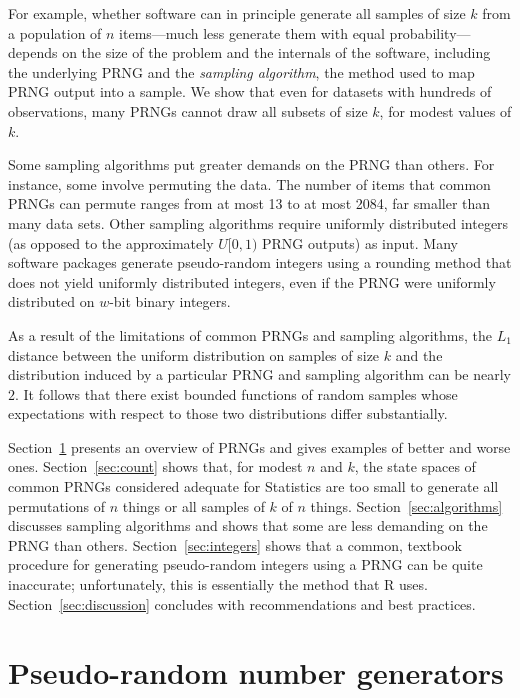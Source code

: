 \documentclass[graybox]{svmult}
\begin{document}
For example, whether software can in principle generate all samples of size $k$ from a population of
$n$ items---much less generate them with equal probability---depends on the size of the problem and the internals of the software, including the underlying PRNG and the \emph{sampling algorithm},
the method used to map PRNG output into a sample.
We show that even for datasets with hundreds of observations, 
many PRNGs cannot draw all subsets of size $k$, for modest values of $k$.

Some sampling algorithms put greater demands on the PRNG than others.
For instance, some involve permuting the data.
The number of items that common PRNGs can permute ranges from at most 13 to at most 2084, far smaller than many data sets.
Other sampling algorithms require uniformly distributed integers (as opposed to the approximately $U[0,1)$ PRNG outputs) as input.
Many software packages generate
pseudo-random integers using a rounding method that does not yield uniformly distributed integers, even
if the PRNG were uniformly distributed on $w$-bit binary integers.

As a result of the limitations of common PRNGs and sampling algorithms,
the $L_1$ distance between the uniform distribution on samples of
size $k$ and the distribution induced by a particular PRNG and sampling algorithm can be nearly $2$.
It follows that there exist bounded functions of random samples whose expectations with respect to those two distributions differ substantially. 

Section~\ref{sec:prngs} presents an overview of PRNGs and gives examples of better and worse ones.
Section~\ref{sec:count} shows that, for modest $n$ and $k$, the state spaces of common PRNGs considered adequate for Statistics are too small to generate all permutations of $n$ things or all samples of $k$ of $n$ things. 
Section~\ref{sec:algorithms} discusses sampling algorithms and shows that some are less demanding on the PRNG than others. 
Section~\ref{sec:integers} shows that a common, textbook procedure for generating pseudo-random integers using a PRNG can be quite inaccurate; unfortunately, this is essentially the method that R uses.
Section~\ref{sec:discussion} concludes with recommendations and best practices.

\section{Pseudo-random number generators}
\label{sec:prngs}
\end{document}
